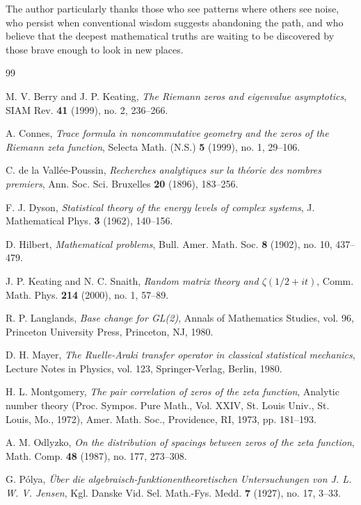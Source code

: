 \documentclass[12pt,letterpaper]{article}
\theoremstyle{plain}
\theoremstyle{definition}
\theoremstyle{remark}
\begin{document}
The author particularly thanks those who see patterns where others see noise, who persist when conventional wisdom suggests abandoning the path, and who believe that the deepest mathematical truths are waiting to be discovered by those brave enough to look in new places.
\pagebreak

\begin{thebibliography}{99}

 M. V. Berry and J. P. Keating, \emph{The Riemann zeros and eigenvalue asymptotics}, SIAM Rev. \textbf{41} (1999), no. 2, 236--266.

 A. Connes, \emph{Trace formula in noncommutative geometry and the zeros of the Riemann zeta function}, Selecta Math. (N.S.) \textbf{5} (1999), no. 1, 29--106.

 C. de la Vallée-Poussin, \emph{Recherches analytiques sur la théorie des nombres premiers}, Ann. Soc. Sci. Bruxelles \textbf{20} (1896), 183--256.

 F. J. Dyson, \emph{Statistical theory of the energy levels of complex systems}, J. Mathematical Phys. \textbf{3} (1962), 140--156.

 D. Hilbert, \emph{Mathematical problems}, Bull. Amer. Math. Soc. \textbf{8} (1902), no. 10, 437--479.

 J. P. Keating and N. C. Snaith, \emph{Random matrix theory and $\zeta(1/2+it)$}, Comm. Math. Phys. \textbf{214} (2000), no. 1, 57--89.

 R. P. Langlands, \emph{Base change for GL(2)}, Annals of Mathematics Studies, vol. 96, Princeton University Press, Princeton, NJ, 1980.

 D. H. Mayer, \emph{The Ruelle-Araki transfer operator in classical statistical mechanics}, Lecture Notes in Physics, vol. 123, Springer-Verlag, Berlin, 1980.

 H. L. Montgomery, \emph{The pair correlation of zeros of the zeta function}, Analytic number theory (Proc. Sympos. Pure Math., Vol. XXIV, St. Louis Univ., St. Louis, Mo., 1972), Amer. Math. Soc., Providence, RI, 1973, pp. 181--193.

 A. M. Odlyzko, \emph{On the distribution of spacings between zeros of the zeta function}, Math. Comp. \textbf{48} (1987), no. 177, 273--308.

 G. Pólya, \emph{Über die algebraisch-funktionentheoretischen Untersuchungen von J. L. W. V. Jensen}, Kgl. Danske Vid. Sel. Math.-Fys. Medd. \textbf{7} (1927), no. 17, 3--33.


\end{thebibliography}
\end{document}
